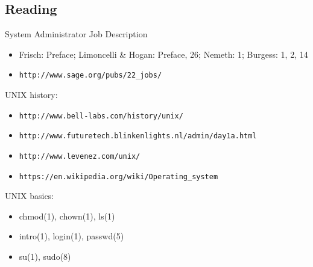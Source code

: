 \documentclass[xga]{xdvislides}
\begin{document}
\subsection{Reading}
System Administrator Job Description
\begin{itemize}
	\item Frisch: Preface; Limoncelli \& Hogan: Preface, 26; Nemeth: 1;
		Burgess: 1, 2, 14
	\item \verb+http://www.sage.org/pubs/22_jobs/+
\end{itemize}

UNIX history:
\begin{itemize}
	\item \verb+http://www.bell-labs.com/history/unix/+
	\item \verb+http://www.futuretech.blinkenlights.nl/admin/day1a.html+
	\item \verb+http://www.levenez.com/unix/+
	\item \verb+https://en.wikipedia.org/wiki/Operating_system+
\end{itemize}

UNIX basics:
\begin{itemize}
	\item chmod(1), chown(1), ls(1)
	\item intro(1), login(1), passwd(5)
	\item su(1), sudo(8)
\end{itemize}

%
%
\end{document}
